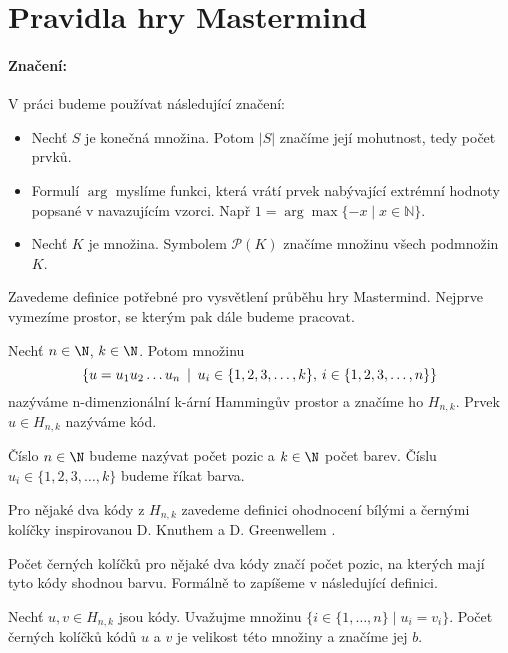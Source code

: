 \chapter{Pravidla hry Mastermind}

\subsubsection{Značení:}
V práci budeme používat následující značení:
\begin{itemize}
    \item Nechť $S$ je konečná množina. Potom $|S|$ značíme její mohutnost, tedy počet prvků.
    \item Formulí $\arg$ myslíme funkci, která vrátí prvek nabývající extrémní hodnoty popsané v navazujícím vzorci. Např $1 = \arg\max \{-x \mid x \in \mathbb{N}\}$.
    \item Nechť $K$ je množina. Symbolem $\mathcal{P}(K)$ značíme množinu všech podmnožin $K$.
\end{itemize}

Zavedeme definice potřebné pro vysvětlení průběhu hry Mastermind. Nejprve vymezíme prostor, se kterým pak dále budeme pracovat. 

\begin{definice}\label{def01:1}
  Nechť $n \in \N $, $k \in \N $. Potom množinu 
  \[ \{ u = u_1u_2 \dots u_n \hspace{2px} \mid \hspace{2px} u_i \in \{1, 2, 3, \dots, k\}, \hspace{2px} i \in \{1, 2, 3, \dots, n\} \}\]
  nazýváme n-dimenzionální k-ární Hammingův prostor a značíme ho $H_{n,k}$. Prvek $u \in H_{n,k}$ nazýváme kód.
\end{definice}
Číslo $n \in \N $ budeme nazývat počet pozic a $k \in \N $ počet barev. Číslu $u_i \in \{1, 2, 3, \dots, k\}$ budeme říkat barva. 


Pro nějaké dva kódy z $H_{n,k}$ zavedeme definici ohodnocení bílými a černými kolíčky inspirovanou D. Knuthem \cite{donald_e__knuth_1977} a D. Greenwellem \cite{greenwell}. 

Počet černých kolíčků pro nějaké dva kódy značí počet pozic, na kterých mají tyto kódy shodnou barvu. Formálně to zapíšeme v následující definici.

\begin{definice}\label{def01:2}
  Nechť $u,v \in H_{n,k}$ jsou kódy. Uvažujme množinu $\{i \in \{1,\dots, n\}\mid  u_i = v_i \}$. Počet černých kolíčků kódů $u$ a $v$ je velikost této množiny a značíme jej $b$. 
\end{definice}

